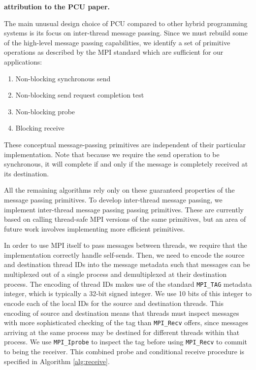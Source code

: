 {\bf attribution to the PCU paper.}

The main unusual design choice of PCU compared to
other hybrid programming systems is
its focus on inter-thread message passing.
Since we must rebuild some of the high-level message
passing capabilities, we identify a set of primitive
operations as described by the MPI standard \cite{walker1996mpi}
which are sufficient for our applications:

\begin{enumerate}
\item Non-blocking synchronous send
\item Non-blocking send request completion test
\item Non-blocking probe
\item Blocking receive
\end{enumerate}

These conceptual message-passing primitives are independent
of their particular implementation.
Note that because we require the send operation to be synchronous,
it will complete if and only if the message is completely received at its
destination.

All the remaining algorithms rely only on these guaranteed properties
of the message passing primitives.
To develop inter-thread message passing, we implement inter-thread
message passing passing primitives.
These are currently based on calling thread-safe MPI versions of the
same primitives, but an area of future work involves implementing
more efficient primitives.

In order to use MPI itself to pass messages between threads, we require
that the implementation correctly handle self-sends.
Then, we need to encode the source and destination thread IDs into the message
metadata such that messages can be multiplexed out of a single process
and demultiplexed at their destination process.
The encoding of thread IDs makes use of the standard \texttt{MPI\_TAG} metadata
integer, which is typically a 32-bit signed integer.
We use 10 bits of this integer to encode each of the local IDs for the
source and destination threads.
This encoding of source and destination means that threads must inspect
messages with more sophisticated checking of the tag than
\texttt{MPI\_Recv}
offers, since messages arriving at the same process may be destined
for different threads within that process.
We use \texttt{MPI\_Iprobe} to inspect the tag before using
\texttt{MPI\_Recv} to commit to being the receiver.
This combined probe and conditional receive procedure is specified
in Algorithm \ref{alg:receive}.

